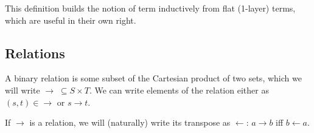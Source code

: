\documentclass[12pt,a4paper,twoside,openright]{report}
\numberwithin{equation}{chapter}		%
\numberwithin{figure}{chapter}			%
\numberwithin{table}{chapter}			%
\theoremstyle{definition}
\theoremstyle{plain}
\begin{document}
This definition builds the notion of term inductively from flat (1-layer) terms, which are useful in their own right.


\subsection{Relations}
A binary relation is some subset of the Cartesian product of two sets, which we will write $\rightarrow\; \subseteq S \times T$. We can write elements of the relation either as $(s, t) \in \rightarrow$ or $s \rightarrow t$.

If $\rightarrow$ is a relation, we will (naturally) write its transpose as $\leftarrow$: $a \rightarrow b$ iff $b \leftarrow a$.
\end{document}
